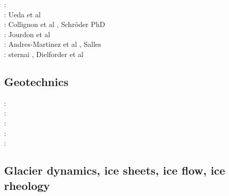 \begin{scriptsize}
\twothousandfourteen: \cite{crbr14}\cite{cokm14}\cite{erhv14}\cite{erhv15}\cite{stsc14}\cite{olbm14} \\
\twothousandfifteen: Ueda et al \cite{uewg15,fohk15,cofk15}\\
\twothousandsixteen: Collignon et al \cite{coyc16}, Schr{\"o}der PhD \cite{schr16}\\
\twothousandeighteen: Jourdon et al \cite{jolp18}\\
\twothousandnineteen: Andres-Martinez et al \cite{anpa19}, Salles \cite{sall19}\\
\twothousandtwenty: sternai \cite{ster20}, Dielforder et al \cite{diho20}
\end{scriptsize}

\subsection{Geotechnics}

\begin{scriptsize}
\nineteenninetynine: \cite{ster99}\\
\twothousandthree: \cite{gora03}\cite{zhll03}\\
\twothousandfour: \cite{gour04}\\
\twothousandsix: \cite{gork06}\\
\twothousandfourteen: \cite{bufy14}
\end{scriptsize}

\subsection{Glacier dynamics, ice sheets, ice flow, ice rheology}

